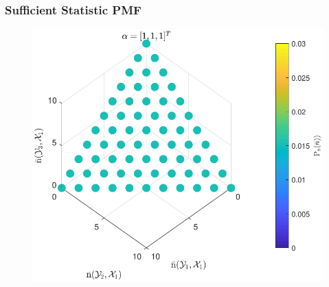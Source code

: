 \documentclass{beamer}
\DeclareMathOperator{\Xcal}{\mathcal{X}}
\DeclareMathOperator{\Ycal}{\mathcal{Y}}
\begin{document}
\begin{frame}
\frametitle{Sufficient Statistic PMF}

\begin{figure}
\centering
\includegraphics[width=1\linewidth]{P_nbar_uni.pdf}
\end{figure}

\end{frame}
\end{document}
